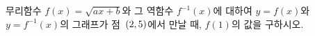 무리함수 $f(x)=\sqrt{ax+b}$와 그 역함수 $f^{-1}(x)$에 대하여 $y=f(x)$와 $y=f^{-1}(x)$의 그래프가 점~$(2{,}\mkern3mu\mathopen{}5)$에서 만날 때, $f(1)$의 값을 구하시오. 
